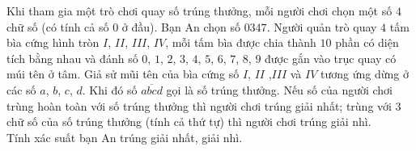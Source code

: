 \begin{bt}%

	Khi tham gia một trò chơi quay số trúng thưởng, mỗi người chơi chọn một số $4$ chữ số (có tính cả số $0$ ở đầu). Bạn An chọn số $0347$. Người quản trò quay $4$ tấm bìa cứng hình tròn $I$, $II$, $III$, $IV$, mỗi tấm bìa được chia thành $10$ phần có diện tích bằng nhau và đánh số $0$, $1$, $2$, $3$, $4$, $5$, $6$, $7$, $8$, $9$ được gắn vào trục quay có múi tên ở tâm. Giả sử mũi tên của bìa cứng số $I$, $II$ ,$III$ và $IV$ tương ứng dừng ở các số $a$, $b$, $c$, $d$. Khi đó số $\overline{abcd}$ gọi là số trúng thưởng. Nếu số của người chơi trùng hoàn toàn với số trúng thưởng thì người chơi trúng giải nhất; trùng với $3$ chữ số của số trúng thưởng (tính cả thứ tự) thì người chơi trúng giải nhì.\\
	Tính xác suất bạn An trúng giải nhất, giải nhì.
\end{bt}

